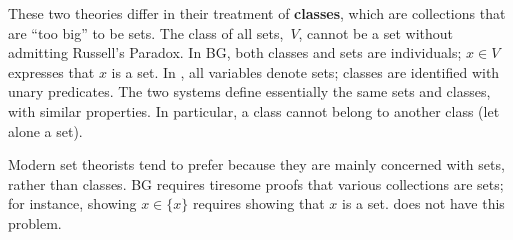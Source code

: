 These two theories differ in their treatment of {\bf classes}, which are
collections that are ``too big'' to be sets.  The class of all sets,~$V$,
cannot be a set without admitting Russell's Paradox.  In BG, both classes
and sets are individuals; $x\in V$ expresses that $x$ is a set.  In {\ZF}, all
variables denote sets; classes are identified with unary predicates.  The
two systems define essentially the same sets and classes, with similar
properties.  In particular, a class cannot belong to another class (let
alone a set).

Modern set theorists tend to prefer {\ZF} because they are mainly concerned
with sets, rather than classes.  BG requires tiresome proofs that various
collections are sets; for instance, showing $x\in\{x\}$ requires showing that
$x$ is a set.  {\ZF} does not have this problem.



